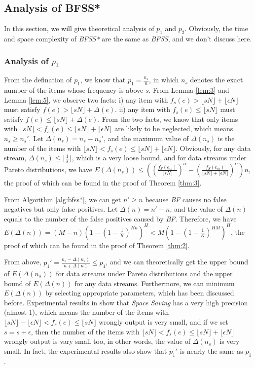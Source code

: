 \documentclass[conference]{IEEEtran}
\begin{document}
\subsection{Analysis of BFSS*}
In this section, we will give theoretical analysis of $p_1$ and $p_2$. Obviously, the time and space complexity of \emph{BFSS*} are the same as \emph{BFSS}, and we don't discuss here.
\subsubsection{\textbf{Analysis of $p_1$}}
From the defination of $p_1$, we know that $p_1=\frac{n_s}{n}$, in which $n_s$ denotes the exact number of the items whose frequency is above $s$. From Lemma \ref{lem:3} and Lemma \ref{lem:5}, we observe two facts: i) any item with $f_s(e)>\lfloor sN\rfloor+\lfloor \epsilon N\rfloor$ must satisfy $f(e)>\lfloor sN\rfloor+\Delta(e)$. ii) any item with $f_s(e)\leq\lfloor sN\rfloor$ must satisfy $f(e)\leq\lfloor sN\rfloor+\Delta(e)$. From the two facts, we know that only items with $\lfloor sN\rfloor<f_s(e)\leq \lfloor sN\rfloor+\lfloor \epsilon N\rfloor$ are likely to be neglected, which means $n_s\geq n_s'$. Let $\Delta(n_s)=n_s-n_s'$, and the maximum value of $\Delta(n_s)$  is the number of the items with $\lfloor sN\rfloor<f_s(e)\leq \lfloor sN\rfloor+\lfloor \epsilon N\rfloor$. Obviously, for any data stream, $\Delta(n_s)\leq\lfloor\frac{1}{s}\rfloor$, which is a very loose bound, and for data streams under Pareto distributions, we have $E(\Delta(n_s))\leq((\frac{f_S(e_m)}{\lfloor sN\rfloor})^\alpha-(\frac{f_S(e_m)}{\lfloor sN\rfloor+\lfloor \epsilon N\rfloor})^\alpha)n$, the proof of which can be found in the proof of Theorem \ref{thm:3}.\par
From Algorithm \ref{alg:bfss*}, we can get $n'\geq n$ because \emph{BF} causes no false negatives but only false positives. Let $\Delta(n)=n'-n$, and the value of $\Delta(n)$ equals to the number of the false positives caused by \emph{BF}. Therefore, we have $E(\Delta(n))=(M-n)(1-(1-\frac{1}{K})^{Hn})^H<M(1-(1-\frac{1}{K})^{HM})^H$, the proof of which can be found in the proof of Theorem \ref{thm:2}.\par
From above, $p_1'=\frac{n_s-\Delta(n_s)}{n+\Delta(n)}\leq p_1$, and we can theoretically get the upper bound of $E(\Delta(n_s))$ for data streams under Pareto distributions and the upper bound of $E(\Delta(n))$ for any data streams. Furthermore, we can minimum $E(\Delta(n))$ by selecting appropriate parameters, which has been discussed before. Experimental results in \cite{IEEEexample:overview,IEEEexample:overview_vldbj} show that \emph{Space Saving} has a very high precision (almost 1), which means the number of the items with $\lfloor sN\rfloor-\lfloor \epsilon N\rfloor<f_s(e)\leq\lfloor sN\rfloor$ wrongly output is very small, and if we set $s=s+\epsilon$, then the number of the items with $\lfloor sN\rfloor<f_s(e)\leq\lfloor sN\rfloor+\lfloor \epsilon N\rfloor$ wrongly output is vary small too, in other words, the value of $\Delta(n_s)$ is very small. In fact, the experimental results also show that $p_1'$ is nearly the same as $p_1$.
\end{document}
